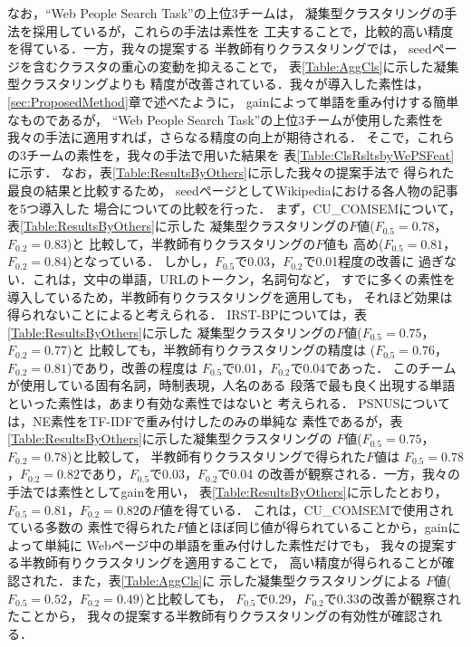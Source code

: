 \documentclass[japanese]{jnlp_1.4}
\begin{document}
\begin{table}[b]
 \label{Table:WikiDetail}

\end{table}
\begin{table}[b]
 \label{Table:ClsRsltsbyWePSFeat}

\end{table}

なお，``Web People Search Task''の上位3チームは，
凝集型クラスタリングの手法を採用しているが，これらの手法は素性を
工夫することで，比較的高い精度を得ている．一方，我々の提案する
半教師有りクラスタリングでは，
seedページを含むクラスタの重心の変動を抑えることで，
表\ref{Table:AggCls}に示した凝集型クラスタリングよりも
精度が改善されている．我々が導入した素性は，
\ref{sec:ProposedMethod}章で述べたように，
gainによって単語を重み付けする簡単なものであるが，
``Web People Search Task''の上位3チームが使用した素性を
我々の手法に適用すれば，さらなる精度の向上が期待される．
そこで，これらの3チームの素性を，我々の手法で用いた結果を
表\ref{Table:ClsRsltsbyWePSFeat}に示す．
なお，表\ref{Table:ResultsByOthers}に示した我々の提案手法で
得られた最良の結果と比較するため，
seedページとしてWikipediaにおける各人物の記事を5つ導入した
場合についての比較を行った．
まず，CU\_COMSEMについて，表\ref{Table:ResultsByOthers}に示した
凝集型クラスタリングの$F$値($F_{0.5}=0.78$，$F_{0.2}=0.83$)と
比較して，半教師有りクラスタリングの$F$値も
高め($F_{0.5}=0.81$，$F_{0.2}=0.84$)となっている．
しかし，$F_{0.5}$で0.03，$F_{0.2}$で0.01程度の改善に
過ぎない．これは，文中の単語，URLのトークン，名詞句など，
すでに多くの素性を導入しているため，半教師有りクラスタリングを適用しても，
それほど効果は得られないことによると考えられる．
IRST-BPについては，表\ref{Table:ResultsByOthers}に示した
凝集型クラスタリングの$F$値($F_{0.5}=0.75$，$F_{0.2}=0.77$)と
比較しても，半教師有りクラスタリングの精度は
($F_{0.5}=0.76$，$F_{0.2}=0.81$)であり，改善の程度は
$F_{0.5}$で0.01，$F_{0.2}$で0.04であった．
このチームが使用している固有名詞，時制表現，人名のある
段落で最も良く出現する単語といった素性は，あまり有効な素性ではないと
考えられる．
PSNUSについては，NE素性をTF-IDFで重み付けしたのみの単純な
素性であるが，表\ref{Table:ResultsByOthers}に示した凝集型クラスタリングの
$F$値($F_{0.5}=0.75$，$F_{0.2}=0.78$)と比較して，
半教師有りクラスタリングで得られた$F$値は
$F_{0.5}=0.78$，$F_{0.2}=0.82$であり，$F_{0.5}$で0.03，$F_{0.2}$で0.04
の改善が観察される．一方，我々の手法では素性としてgainを用い，
表\ref{Table:ResultsByOthers}に示したとおり，
$F_{0.5}=0.81$，$F_{0.2}=0.82$の$F$値を得ている．
これは，CU\_COMSEMで使用されている多数の
素性で得られた$F$値とほぼ同じ値が得られていることから，gainによって単純に
Webページ中の単語を重み付けした素性だけでも，
我々の提案する半教師有りクラスタリングを適用することで，
高い精度が得られることが確認された．また，表\ref{Table:AggCls}に
示した凝集型クラスタリングによる
$F$値($F_{0.5}=0.52$，$F_{0.2}=0.49$)と比較しても，
$F_{0.5}$で0.29，$F_{0.2}$で0.33の改善が観察されたことから，
我々の提案する半教師有りクラスタリングの有効性が確認される．
\end{document}
